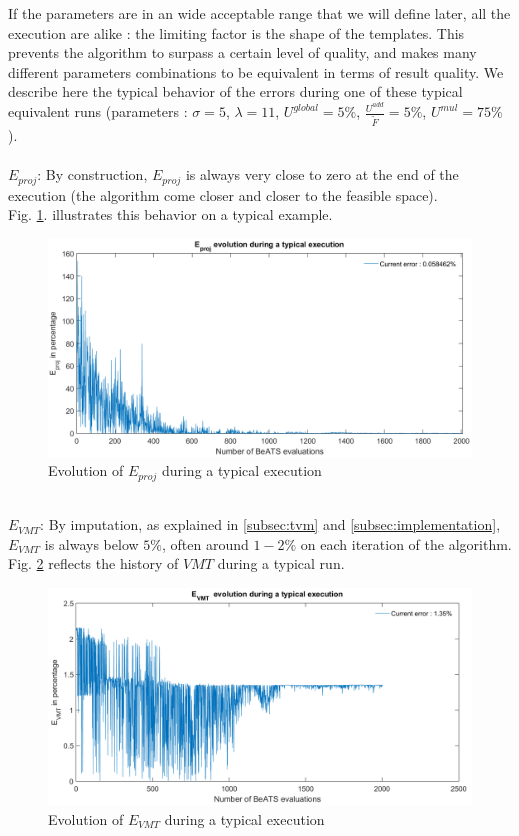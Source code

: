 If the parameters are in an wide acceptable range that we will define later, all the execution are alike : the limiting factor is the shape of the templates. This prevents the algorithm to surpass a certain level of quality, and makes many different parameters combinations to be equivalent in terms of result quality.
We describe here the typical behavior of the errors during one of these typical equivalent runs (parameters : $\sigma=5$, $\lambda=11$, $U^{global}=5\% $, $\frac{U^{add}}{\widetilde{F}}=5\% $, $U^{mul}=75 \% $).\\
\\
\emph{$E_{proj}$}: By construction, $E_{proj}$ is always very close to zero at the end of the execution (the algorithm come closer and closer to the feasible space).\\
Fig. \ref{fig:eprojexample}. illustrates this behavior on a typical example.\\ 
\begin{figure}[h]
	\label{fig:eprojexample}
	\caption{Evolution of $E_{proj}$ during a typical execution}
	\includegraphics[width=7in]{figures/results_figures/eprojexample.png}
\end{figure}	
\\
\emph{$E_{VMT}$}: By imputation, as explained in \ref{subsec:tvm} and \ref{subsec:implementation}, $E_{VMT}$ is always below $5\%$, often around $1-2\%$ on each iteration of the algorithm.\\
Fig. \ref{fig:vmtexample} reflects the history of $VMT$ during a typical run.\\
\begin{figure}[h]
	\label{fig:vmtexample}
	\caption{Evolution of $E_{VMT}$ during a typical execution}
	\includegraphics[width=7in]{figures/results_figures/VMTexample.png}
\end{figure}	
